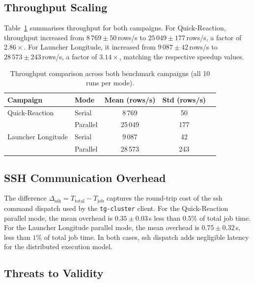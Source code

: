 \subsection{Throughput Scaling}
\label{subsec:eval-throughput}

Table~\ref{tab:throughput-summary} summarises throughput for both campaigns.  For
Quick-Reaction, throughput increased from $8\,769 \pm 50$\,rows/s to
$25\,049 \pm 177$\,rows/s, a factor of $2.86\times$.  For Launcher Longitude, it
increased from $9\,087 \pm 42$\,rows/s to $28\,573 \pm 243$\,rows/s, a factor of
$3.14\times$, matching the respective speedup values.

\begin{table}[htbp]
\centering
\caption{Throughput comparison across both benchmark campaigns (all 10 runs per mode).}
\label{tab:throughput-summary}
\begin{tabular}{llccc}
\toprule
Campaign & Mode & Mean (rows/s) & Std (rows/s) \\
\midrule
Quick-Reaction   & Serial   & 8\,769  & 50  \\
                 & Parallel & 25\,049 & 177 \\
\addlinespace
Launcher Longitude & Serial   & 9\,087  & 42  \\
                   & Parallel & 28\,573 & 243 \\
\bottomrule
\end{tabular}
\end{table}

\subsection{SSH Communication Overhead}
\label{subsec:eval-ssh}

The difference $\Delta_{\text{ssh}} = T_{\text{total}} - T_{\text{job}}$ captures the
round-trip cost of the \gls{ssh} command dispatch used by the \texttt{tg-cluster} client.
For the Quick-Reaction parallel mode, the mean overhead is $0.35 \pm 0.03$\,s  
less than $0.5\%$ of total job time.  For the Launcher Longitude parallel mode, the mean
overhead is $0.75 \pm 0.32$\,s, less than $1\%$ of total job time.  In both cases,
\gls{ssh} dispatch adds negligible latency for the distributed execution model.

\subsection{Threats to Validity}
\label{subsec:eval-threats}

